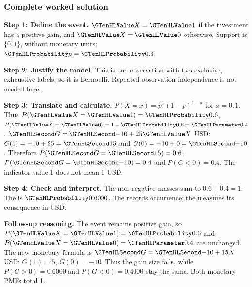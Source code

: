 \subsubsection*{Complete worked solution}\label{sol:c3-gain}
\par\noindent\begin{minipage}{\linewidth}
\textbf{Step 1: Define the event.} $\Indicator{X}=\Indicator{1}$ if the investment has a positive gain, and $\Indicator{X}=\Indicator{0}$ otherwise. Support is $\{0,1\}$, without monetary units; $\SuccessProb{p}=\SuccessProb{0.6}$.
\end{minipage}\par\medskip
\par\noindent\begin{minipage}{\linewidth}
\textbf{Step 2: Justify the model.} This is one observation with two exclusive, exhaustive labels, so it is Bernoulli. Repeated-observation independence is not needed here.
\end{minipage}\par\medskip
\par\noindent\begin{minipage}{\linewidth}
\textbf{Step 3: Translate and calculate.} $P(X=x)=p^x(1-p)^{1-x}$ for $x=0,1$. Thus $P(\Indicator{X}=\Indicator{1})=\SuccessProb{0.6}$, $P(\Indicator{X}=\Indicator{0})=1-\SuccessProb{0.6}=\FailureProb{0.4}$. $\Money{G}=\Money{-10}+25\Indicator{X}$ USD: $G(1)=-10+25=\Money{15}$ and $G(0)=-10+0=\Money{-10}$. Therefore $P(\Money{G}=\Money{15})=0.6$, $P(\Money{G}=\Money{-10})=0.4$ and $P(G<0)=0.4$. The indicator value 1 does not mean 1 USD.
\end{minipage}\par\medskip
\par\noindent\begin{minipage}{\linewidth}
\textbf{Step 4: Check and interpret.} The non-negative masses sum to $ 0.6+0.4=1$. The  is $\SuccessProb{0.6000}$. The  records occurrence; the  measures its consequence in USD.
\end{minipage}\par\medskip

\textbf{Follow-up reasoning.} The event remains positive gain, so $P(\Indicator{X}=\Indicator{1})=\SuccessProb{0.6}$ and $P(\Indicator{X}=\Indicator{0})=\FailureProb{0.4}$ are unchanged. The new monetary formula is $\Money{G}=\Money{-10}+15X$ USD: $G(1)=5$, $G(0)=-10$. Thus the gain size falls, while $P(G>0)=0.6000$ and $P(G<0)=0.4000$ stay the same. Both monetary PMFs total 1.
\clearpage
